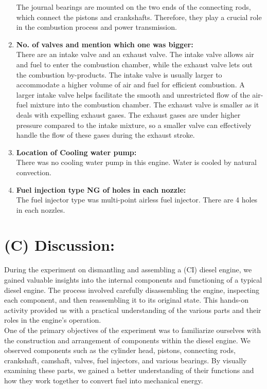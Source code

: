 \documentclass[12pt]{article}
\begin{document}
\begin{enumerate}[label=(\roman*)]
    The journal bearings are mounted on the two ends of the connecting rods, which connect the pistons and crankshafts. Therefore, they play a crucial role in the combustion process and power transmission. 

    \vspace*{0.3cm}
    \item \textbf{No. of valves and mention which one was bigger:} \\
    There are an intake valve and an exhaust valve. The intake valve allows air and fuel to enter the combustion chamber, while the exhaust valve lets out the combustion by-products. The intake valve is usually larger to accommodate a higher volume of air and fuel for efficient combustion.  A larger intake valve helps facilitate the smooth and unrestricted flow of the air-fuel mixture into the combustion chamber. The exhaust valve is smaller as it deals with expelling exhaust gases. The exhaust gases are under higher pressure compared to the intake mixture, so a smaller valve can effectively handle the flow of these gases during the exhaust stroke.

    \item \textbf{Location of Cooling water pump:} \\
    There was no cooling water pump in this engine. Water is cooled by natural convection. 

    \item \textbf{Fuel injection type NG of holes in each nozzle:} \\
    The fuel injector type was multi-point airless fuel injector. There are 4 holes in each nozzles. 
\end{enumerate}

\pagebreak
\section*{(C) Discussion:}
During the experiment on dismantling and assembling a (CI) diesel engine, we gained valuable insights into the internal components and functioning of a typical diesel engine. The process involved carefully disassembling the engine, inspecting each component, and then reassembling it to its original state. This hands-on activity provided us with a practical understanding of the various parts and their roles in the engine's operation.\\

One of the primary objectives of the experiment was to familiarize ourselves with the construction and arrangement of components within the diesel engine. We observed components such as the cylinder head, pistons, connecting rods, crankshaft, camshaft, valves, fuel injectors, and various bearings. By visually examining these parts, we gained a better understanding of their functions and how they work together to convert fuel into mechanical energy.\\
\end{document}
